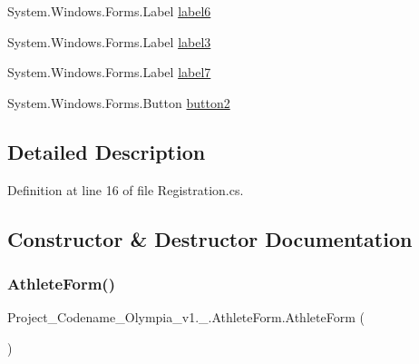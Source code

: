 \begin{DoxyCompactItemize}
\item 
System.\+Windows.\+Forms.\+Label \hyperlink{classProject__Codename__Olympia__v1_1_1__0_1_1AthleteForm_acda1b3d0c26acf84ce278c6dc19dbbb0}{label6}
\item 
System.\+Windows.\+Forms.\+Label \hyperlink{classProject__Codename__Olympia__v1_1_1__0_1_1AthleteForm_a081a9600bb00c79342cdb3b0299fc71f}{label3}
\item 
System.\+Windows.\+Forms.\+Label \hyperlink{classProject__Codename__Olympia__v1_1_1__0_1_1AthleteForm_a6982ab587209bff11efc0bc91fd6720b}{label7}
\item 
System.\+Windows.\+Forms.\+Button \hyperlink{classProject__Codename__Olympia__v1_1_1__0_1_1AthleteForm_a2a040bed7b07f370eff0e9a4233a6cbd}{button2}
\end{DoxyCompactItemize}


\subsection{Detailed Description}


Definition at line 16 of file Registration.\+cs.



\subsection{Constructor \& Destructor Documentation}
\mbox{\label{classProject__Codename__Olympia__v1_1_1__0_1_1AthleteForm_a00727747bf1d1c9b228a5b0d371155bb}} 
\subsubsection{\texorpdfstring{Athlete\+Form()}{AthleteForm()}}
{\footnotesize\ttfamily Project\+\_\+\+Codename\+\_\+\+Olympia\+\_\+v1.\+\_.\+Athlete\+Form.\+Athlete\+Form (\begin{DoxyParamCaption}{ }\end{DoxyParamCaption})\hspace{0.3cm}{\ttfamily [inline]}}



